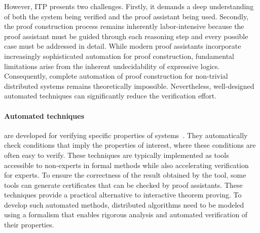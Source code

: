 However, ITP presents two challenges. Firstly, it demands a deep understanding of both the system being verified and the proof assistant being used. Secondly, the proof construction process remains inherently labor-intensive because the proof assistant must be guided through each reasoning step and every possible case must be addressed in detail.
While modern proof assistants incorporate increasingly sophisticated automation for proof construction, fundamental limitations arise from the inherent undecidability of expressive logics.
Consequently, complete automation of proof construction for non-trivial distributed systems remains theoretically impossible. Nevertheless, well-designed automated techniques can significantly reduce the verification effort.

\paragraph{Automated techniques} are developed for verifying specific properties of systems~\cite{contejean2011automated,giesl2014proving,blanchet2016modeling}. They automatically check conditions that imply the properties of interest, where these conditions are often easy to verify.
These techniques are typically implemented as tools accessible to non-experts in formal methods while also accelerating verification for experts. To ensure the correctness of the result obtained by the tool, some tools can generate certificates that can be checked by proof assistants.
These techniques provide a practical alternative to interactive theorem proving.
To develop such automated methods, distributed algorithms need to be modeled
using a formalism that enables rigorous analysis
and automated verification of their properties. 

